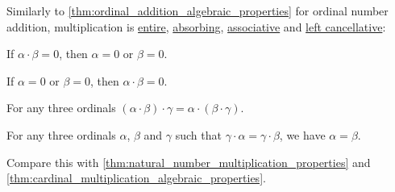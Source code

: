 \begin{proposition}\label{thm:ordinal_multiplication_algebraic_properties}
  Similarly to \cref{thm:ordinal_addition_algebraic_properties} for ordinal number addition, multiplication is \hyperref[def:entire_semiring]{entire}, \hyperref[def:semigroup_absorbing_element]{absorbing}, \hyperref[def:binary_operation/associative]{associative} and \hyperref[def:binary_operation/cancellative]{left cancellative}:
  \begin{thmenum}
     If \( \alpha \cdot \beta = 0 \), then \( \alpha = 0 \) or \( \beta = 0 \).

     If \( \alpha = 0 \) or \( \beta = 0 \), then \( \alpha \cdot \beta = 0 \).

     For any three ordinals \( (\alpha \cdot \beta) \cdot \gamma = \alpha \cdot (\beta \cdot \gamma) \).

     For any three ordinals \( \alpha \), \( \beta \) and \( \gamma \) such that \( \gamma \cdot \alpha = \gamma \cdot \beta \), we have \( \alpha = \beta \).
  \end{thmenum}

  Compare this with \cref{thm:natural_number_multiplication_properties} and \cref{thm:cardinal_multiplication_algebraic_properties}.
\end{proposition}
